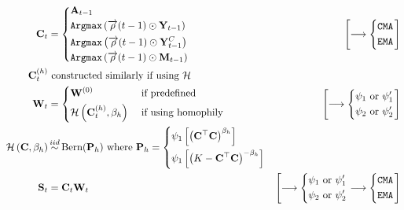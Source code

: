 \documentclass[fleqn]{article}
\newcommand\iidsim{\stackrel{\mathclap{iid}}{\sim}}
\begin{document}
\begin{align*}
    \mathbf{C}_t &=
        \begin{dcases}
            \mathbf{A}_{t-1} \\
            \texttt{Argmax}\left( \overrightarrow{\rho}(t-1) \odot \mathbf{Y}_{t-1}\right) \\
            \texttt{Argmax}\left( \overrightarrow{\rho}(t-1) \odot \mathbf{Y}^C_{t-1}\right) \\
            \texttt{Argmax}\left( \overrightarrow{\rho}(t-1) \odot \mathbf{M}_{t-1}\right)
        \end{dcases}
        \qquad
        &\left[
            \longrightarrow
            \begin{dcases}
                \texttt{CMA} \\
                \texttt{EMA}
            \end{dcases}
        \right]
    \\
    \mathbf{C}^{(h)}_t &
    \text{ constructed similarly if using } \mathcal{H}
    \\
    \mathbf{W}_t &=
        \begin{dcases}
            \mathbf{W}^{(0)}
            &\text{ if predefined}
            \\
            \mathcal{H}\left(
                \mathbf{C}^{(h)}_t,
                \beta_h
            \right)
            &\text{ if using homophily}
        \end{dcases}
        \qquad
        &\left[
            \longrightarrow
            \begin{dcases}
                \psi_1 \text{ or } \psi^{\prime}_1 \\
                \psi_2 \text{ or } \psi^{\prime}_2
            \end{dcases}
        \right]
    \\
    \mathcal{H}\left(
        \mathbf{C},
        \beta_h
    \right) &\iidsim
    \text{Bern}(\mathbf{P}_h)
    \text{ where }
    \mathbf{P}_h =
    \begin{dcases}
        \psi_1 \left[
            \left(
                \mathbf{C}^{\top}
                \mathbf{C}
            \right)^{\beta_h}
        \right] \\
        \psi_1 \left[
            \left(
                K -
                \mathbf{C}^{\top}
                \mathbf{C}
            \right)^{-\beta_h}
        \right]
    \end{dcases}
    \\
    \mathbf{S}_t &=
        \mathbf{C}_t
        \mathbf{W}_t
        \qquad
        &\left[
            \longrightarrow
            \begin{dcases}
                \psi_1 \text{ or } \psi^{\prime}_1 \\
                \psi_2 \text{ or } \psi^{\prime}_2
            \end{dcases}
            \longrightarrow
            \begin{dcases}
                \texttt{CMA} \\
                \texttt{EMA}
            \end{dcases}
        \right]
\end{align*}
\end{document}
